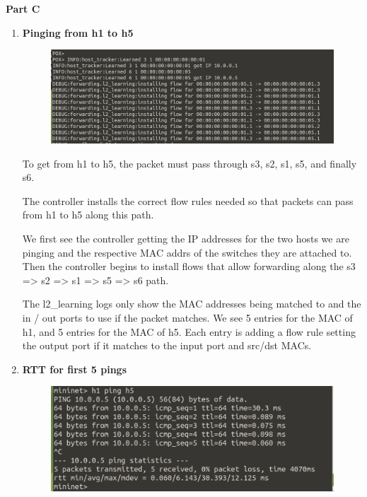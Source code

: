 \documentclass{article}[12pt]
\begin{document}
{\huge \textbf{Part C}}

\begin{enumerate}
    \item \textbf{Pinging from h1 to h5}

    \begin{figure}[!h]
        \centering
        \includegraphics[width=\textwidth,height=\textheight,keepaspectratio]{ping.png}
    \end{figure}

    To get from h1 to h5, the packet must pass through s3, s2, s1, s5, and finally s6.

    The controller installs the correct flow rules needed so that packets can pass from h1 to h5 along this path.

    We first see the controller getting the IP addresses for the two hosts we are pinging and the respective MAC addrs of the switches they are attached to. Then the controller begins to install flows that allow forwarding along the s3 => s2 => s1 => s5 => s6 path.

    The l2\_learning logs only show the MAC addresses being matched to and the in / out ports to use if the packet matches. We see 5 entries for the MAC of h1, and 5 entries for the MAC of h5. Each entry is adding a flow rule setting the output port if it matches to the input port and src/dst MACs. 

    \item \textbf{RTT for first 5 pings}
    
    \begin{figure}[!h]
        \centering
        \includegraphics[width=\textwidth,height=\textheight,keepaspectratio]{rtt.png}
    \end{figure}


\end{enumerate}
\end{document}
